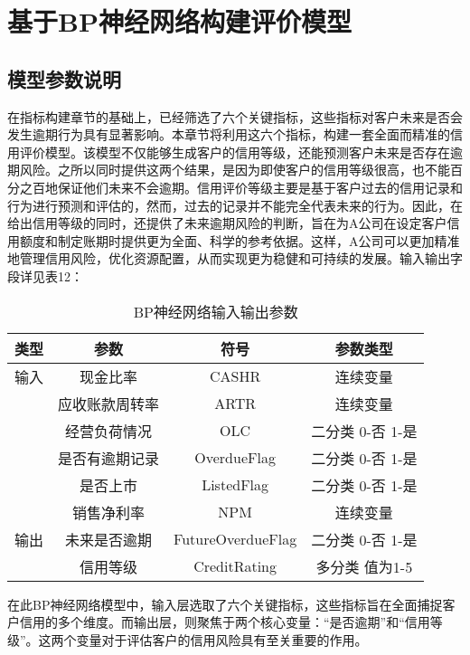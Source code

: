 \section{基于BP神经网络构建评价模型}

\subsection{模型参数说明}
在指标构建章节的基础上，已经筛选了六个关键指标，这些指标对客户未来是否会发生逾期行为具有显著影响。本章节将利用这六个指标，构建一套全面而精准的信用评价模型。该模型不仅能够生成客户的信用等级，还能预测客户未来是否存在逾期风险。之所以同时提供这两个结果，是因为即使客户的信用等级很高，也不能百分之百地保证他们未来不会逾期。信用评价等级主要是基于客户过去的信用记录和行为进行预测和评估的，然而，过去的记录并不能完全代表未来的行为。因此，在给出信用等级的同时，还提供了未来逾期风险的判断，旨在为A公司在设定客户信用额度和制定账期时提供更为全面、科学的参考依据。这样，A公司可以更加精准地管理信用风险，优化资源配置，从而实现更为稳健和可持续的发展。输入输出字段详见表12：

\begin{table}[h]
	\caption{BP神经网络输入输出参数}
	\label{tab:papercomponents}
	\centering
	\begin{tabular}{cccc}
		\toprule
		{\bfseries 类型} & {\bfseries 参数}& {\bfseries 符号} & {\bfseries 参数类型}  \\
		\midrule
		输入 & 现金比率  & CASHR  &连续变量\\
		& 应收账款周转率 &ARTR&连续变量   \\
		&  经营负荷情况 &OLC& 二分类 0-否 1-是\\
		& 是否有逾期记录&OverdueFlag  & 二分类 0-否 1-是   \\		 
		& 是否上市   &ListedFlag& 二分类 0-否 1-是  \\
		& 销售净利率& NPM& 连续变量\\		 
		输出& 未来是否逾期 &FutureOverdueFlag & 二分类 0-否 1-是  \\
		& 信用等级& CreditRating & 多分类 值为1-5  \\
		\bottomrule
	\end{tabular}
\end{table}

在此BP神经网络模型中，输入层选取了六个关键指标，这些指标旨在全面捕捉客户信用的多个维度。而输出层，则聚焦于两个核心变量：“是否逾期”和“信用等级”。这两个变量对于评估客户的信用风险具有至关重要的作用。



